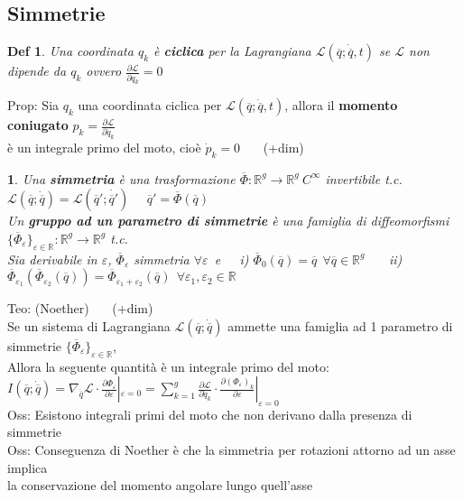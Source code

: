 \documentclass{article}
\theoremstyle{unnumbered}
\newtheorem* {theoremT}{Def}
\theoremstyle{unnumbered1}
\newtheorem* {theoremT1}{}
\newenvironment{defi}{\begin{gBox}\begin{theoremT}}{\end{theoremT}\end{gBox}}
\newenvironment{Ndefi}{\begin{gBox}\begin{theoremT1}}{\end{theoremT1}\end{gBox}}
\begin{document}
\subsection{Simmetrie}
%
\begin{defi}
Una coordinata $q_k$ è \textbf{ciclica} per la Lagrangiana $\mathcal{L}(\overline{q};\dot{\overline{q}},t)$ se $\mathcal{L}$ non dipende da $q_k$ ovvero $\frac{\partial\mathcal{L}}{\partial q_k}=0$
\end{defi}
%
Prop: Sia $q_k$ una coordinata ciclica per $\mathcal{L}(\overline{q};\dot{\overline{q}},t)$, allora il \textbf{momento coniugato} $p_k=\frac{\partial \mathcal{L}}{\partial \dot{q}_k}$ \\
\phantom{Prop: }è un integrale primo del moto, cioè $\dot{p}_k=0$ \ \ \ (+dim)\\
%
%
%
\begin{Ndefi}
Una \textbf{simmetria} è una trasformazione $\overline{\Phi}:\mathbb{R}^g\rightarrow \mathbb{R}^g \ C^{\infty}$ invertibile t.c. $\mathcal{L}(\overline{q};\dot{\overline{q}})=\mathcal{L}(\overline{q}';\dot{\overline{q}'})$ \ \ $\overline{q}'=\overline{\Phi}(\overline{q})$\\
%
Un \textbf{gruppo ad un parametro di simmetrie} è una famiglia di diffeomorfismi $\{\overline{\Phi}_{\varepsilon}\}_{\varepsilon\in\mathbb{R}}:\mathbb{R}^g\rightarrow\mathbb{R}^g$ t.c.\\ Sia derivabile in $\varepsilon$, $\overline{\Phi}_{\varepsilon}$ simmetria $\forall \varepsilon$\ e\ \ \
i) $\overline{\Phi}_0(\overline{q})=\overline{q} \ \ \forall \overline{q}\in\mathbb{R}^g$ \ \ \ ii) $\overline{\Phi}_{\varepsilon_1}(\overline{\Phi}_{\varepsilon_2}(\overline{q}))=\overline{\Phi}_{\varepsilon_1+\varepsilon_2}(\overline{q}) \ \ \forall \varepsilon_1, \varepsilon_2\in\mathbb{R}$
\end{Ndefi}
%
%
%
Teo: (Noether) \ \ \ (+dim) \\
Se un sistema di Lagrangiana $\mathcal{L}(\overline{q};\dot{\overline{q}})$ ammette una famiglia ad 1 parametro di simmetrie $\{\overline{\Phi}_{\varepsilon}\}_{\varepsilon\in\mathbb{R}}$,\\
Allora la seguente quantità è un integrale primo del moto: \ \ \ \ $I(\overline{q};\dot{\overline{q}})=\nabla_{\dot{\overline{q}}}\mathcal{L}\cdot\frac{\partial\Phi_{\varepsilon}}{\partial\varepsilon}|_{\varepsilon=0}=\sum_{k=1}^g\frac{\partial\mathcal{L}}{\partial\dot{q}_k}\cdot \frac{\partial(\Phi_{\varepsilon})_k}{\partial\varepsilon}|_{\varepsilon=0}$ \\
Oss: Esistono integrali primi del moto che non derivano dalla presenza di simmetrie\\
%
Oss: Conseguenza di Noether è che la simmetria per rotazioni attorno ad un asse implica\\
\phantom{Oss: }la conservazione del momento angolare lungo quell'asse
\end{document}
